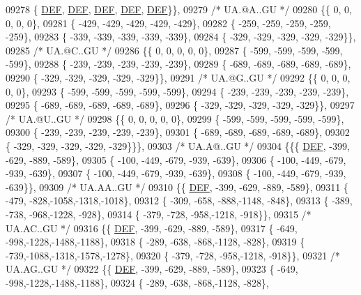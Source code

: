 \begin{DoxyCode}
09278 \{  \mbox{\hyperlink{1_88_84__epars_8h_a397419fc12b37ed479c8abb9d444d843}{DEF}},  \mbox{\hyperlink{1_88_84__epars_8h_a397419fc12b37ed479c8abb9d444d843}{DEF}},  \mbox{\hyperlink{1_88_84__epars_8h_a397419fc12b37ed479c8abb9d444d843}{DEF}},  \mbox{\hyperlink{1_88_84__epars_8h_a397419fc12b37ed479c8abb9d444d843}{DEF}},  \mbox{\hyperlink{1_88_84__epars_8h_a397419fc12b37ed479c8abb9d444d843}{DEF}}\}\},
09279 \textcolor{comment}{/* UA.@A..GU */}
09280 \{\{    0,    0,    0,    0,    0\},
09281 \{ -429, -429, -429, -429, -429\},
09282 \{ -259, -259, -259, -259, -259\},
09283 \{ -339, -339, -339, -339, -339\},
09284 \{ -329, -329, -329, -329, -329\}\},
09285 \textcolor{comment}{/* UA.@C..GU */}
09286 \{\{    0,    0,    0,    0,    0\},
09287 \{ -599, -599, -599, -599, -599\},
09288 \{ -239, -239, -239, -239, -239\},
09289 \{ -689, -689, -689, -689, -689\},
09290 \{ -329, -329, -329, -329, -329\}\},
09291 \textcolor{comment}{/* UA.@G..GU */}
09292 \{\{    0,    0,    0,    0,    0\},
09293 \{ -599, -599, -599, -599, -599\},
09294 \{ -239, -239, -239, -239, -239\},
09295 \{ -689, -689, -689, -689, -689\},
09296 \{ -329, -329, -329, -329, -329\}\},
09297 \textcolor{comment}{/* UA.@U..GU */}
09298 \{\{    0,    0,    0,    0,    0\},
09299 \{ -599, -599, -599, -599, -599\},
09300 \{ -239, -239, -239, -239, -239\},
09301 \{ -689, -689, -689, -689, -689\},
09302 \{ -329, -329, -329, -329, -329\}\}\},
09303 \textcolor{comment}{/* UA.A@..GU */}
09304 \{\{\{  \mbox{\hyperlink{1_88_84__epars_8h_a397419fc12b37ed479c8abb9d444d843}{DEF}}, -399, -629, -889, -589\},
09305 \{ -100, -449, -679, -939, -639\},
09306 \{ -100, -449, -679, -939, -639\},
09307 \{ -100, -449, -679, -939, -639\},
09308 \{ -100, -449, -679, -939, -639\}\},
09309 \textcolor{comment}{/* UA.AA..GU */}
09310 \{\{  \mbox{\hyperlink{1_88_84__epars_8h_a397419fc12b37ed479c8abb9d444d843}{DEF}}, -399, -629, -889, -589\},
09311 \{ -479, -828,-1058,-1318,-1018\},
09312 \{ -309, -658, -888,-1148, -848\},
09313 \{ -389, -738, -968,-1228, -928\},
09314 \{ -379, -728, -958,-1218, -918\}\},
09315 \textcolor{comment}{/* UA.AC..GU */}
09316 \{\{  \mbox{\hyperlink{1_88_84__epars_8h_a397419fc12b37ed479c8abb9d444d843}{DEF}}, -399, -629, -889, -589\},
09317 \{ -649, -998,-1228,-1488,-1188\},
09318 \{ -289, -638, -868,-1128, -828\},
09319 \{ -739,-1088,-1318,-1578,-1278\},
09320 \{ -379, -728, -958,-1218, -918\}\},
09321 \textcolor{comment}{/* UA.AG..GU */}
09322 \{\{  \mbox{\hyperlink{1_88_84__epars_8h_a397419fc12b37ed479c8abb9d444d843}{DEF}}, -399, -629, -889, -589\},
09323 \{ -649, -998,-1228,-1488,-1188\},
09324 \{ -289, -638, -868,-1128, -828\},

\end{DoxyCode}
